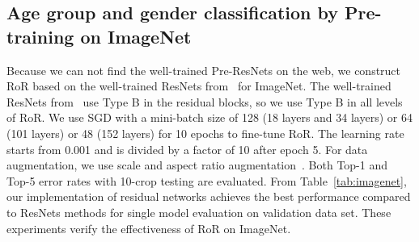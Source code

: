 \documentclass[journal]{IEEEtran}
\begin{document}
\subsection{Age group and gender classification by Pre-training on ImageNet}
Because we can not find the well-trained Pre-ResNets on the web, we construct RoR based on the well-trained ResNets from~\cite{gross2016facebookres} for ImageNet. The well-trained ResNets from~\cite{gross2016facebookres} use Type B in the residual blocks, so we use Type B in all levels of RoR. We use SGD with a mini-batch size of 128 (18 layers and 34 layers) or 64 (101 layers) or 48 (152 layers) for 10 epochs to fine-tune RoR. The learning rate starts from 0.001 and is divided by a factor of 10 after epoch 5. For data augmentation, we use scale and aspect ratio augmentation~\cite{gross2016facebookres}. Both Top-1 and Top-5 error rates with 10-crop testing are evaluated. From Table~\ref{tab:imagenet}, our implementation of residual networks achieves the best performance compared to ResNets methods for single model evaluation on validation data set. These experiments verify the effectiveness of RoR on ImageNet.
\end{document}
